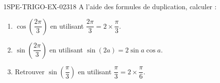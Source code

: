 \begin{exercice}{1SPE-TRIGO-EX-023}{1}{8}
A l'aide des formules de duplication, calculer :
\begin{enumerate}
  \item $\cos\!\left(\dfrac{2\pi}{3}\right)$ en utilisant $\dfrac{2\pi}{3} = 2 \times \dfrac{\pi}{3}$.
  \item $\sin\!\left(\dfrac{2\pi}{3}\right)$ en utilisant $\sin(2a) = 2\sin a \cos a$.
  \item Retrouver $\sin\!\left(\dfrac{\pi}{3}\right)$ en utilisant $\dfrac{\pi}{3} = 2 \times \dfrac{\pi}{6}$.
\end{enumerate}
\end{exercice}
